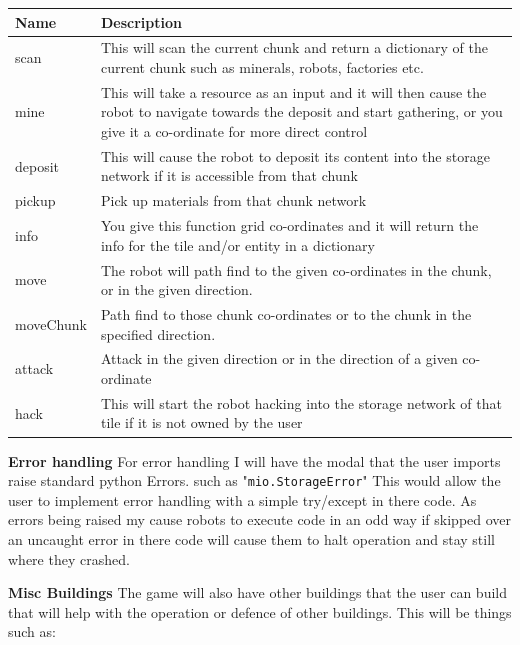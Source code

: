 \documentclass[12pt]{article}
\def\code#1{\texttt{#1}}
\begin{document}
\begin{table}
{\renewcommand\arraystretch{1.25}
\begin{tabular}{l|l|l} \hline
Name & \multicolumn{2}{l}{Description} \\ \hline\hline
scan & \multicolumn{2}{p{14cm}}{This will scan the current chunk and return a dictionary of the current chunk such as minerals, robots, factories etc.} \\ \hline
mine & \multicolumn{2}{p{14cm}}{This will take a resource as an input and it will then cause the robot to navigate towards the deposit and start gathering, or you give it a co-ordinate for more direct control} \\ \hline
deposit & \multicolumn{2}{p{14cm}}{This will cause the robot to deposit its content into the storage network if it is accessible from that chunk} \\ \hline
pickup & \multicolumn{2}{p{14cm}}{Pick up materials from that chunk network} \\ \hline
info & \multicolumn{2}{p{14cm}}{You give this function grid co-ordinates and it will return the info for the tile and/or entity in a dictionary} \\ \hline
move & \multicolumn{2}{p{14cm}}{The robot will path find to the given co-ordinates in the chunk, or in the given direction.} \\ \hline
moveChunk & \multicolumn{2}{p{14cm}}{Path find to those chunk co-ordinates or to the chunk in the specified direction.} \\ \hline
attack & \multicolumn{2}{p{14cm}}{Attack in the given direction or in the direction of a given co-ordinate} \\ \hline
hack & \multicolumn{2}{p{14cm}}{This will start the robot hacking into the storage network of that tile if it is not owned by the user} \\ \hline
\end{tabular}}
\end{table}

\textbf{Error handling}\newline
For error handling I will have the modal that the user imports raise standard python Errors. such as "\code{mio.StorageError}" This would allow the user to implement error handling with a simple try/except in there code. As errors being raised my cause robots to execute code in an odd way if skipped over an uncaught error in there code will cause them to halt operation and stay still where they crashed.

\textbf{Misc Buildings}\newline
The game will also have other buildings that the user can build that will help with the operation or defence of other buildings. This will be things such as:
\end{document}
